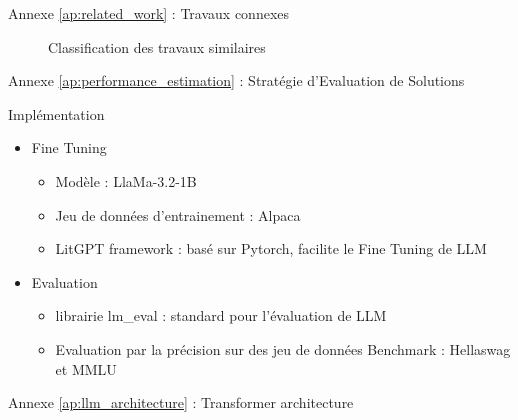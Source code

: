 \begin{frame}{Annexe \ref{ap:related_work} : Travaux connexes}
    \label{ap:related_work}
    \begin{figure}
        \centering
        
        \caption{Classification des travaux similaires}
   \end{figure} 
   
\end{frame}

\begin{frame}{Annexe \ref{ap:performance_estimation} : Stratégie d'Evaluation de Solutions}
    \label{ap:performance_estimation}
    \begin{block}{Implémentation}
        \begin{itemize}
            \item Fine Tuning
            \begin{itemize}
                \item Modèle : LlaMa-3.2-1B
                \item Jeu de données d'entrainement : Alpaca
                \item LitGPT framework : basé sur Pytorch, facilite le Fine Tuning de LLM
            \end{itemize}
            \item Evaluation
            \begin{itemize}
                \item librairie lm\_eval : standard pour l'évaluation de LLM
                \item Evaluation par la précision sur des jeu de données Benchmark : Hellaswag et MMLU
            \end{itemize}
        \end{itemize}

        
    \end{block}

\end{frame}

\begin{frame}{Annexe \ref{ap:llm_architecture} : Transformer architecture}
    \label{ap:llm_architecture}
    \centering
    \resizebox{!}{0.6\paperheight}{
        
    }
\end{frame}

